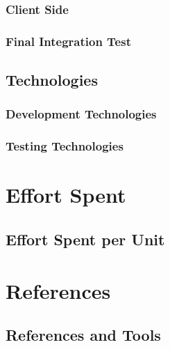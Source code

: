 \documentclass[a4paper,12pt]{article}
\begin{document}
\subsubsection{Client Side}
\subsubsection{Final Integration Test}
\subsection{Technologies}
\subsubsection{Development Technologies}
\subsubsection{Testing Technologies}

\section{Effort Spent}
\subsection{Effort Spent per Unit}

\section{References}
\subsection{References and Tools}
\end{document}
